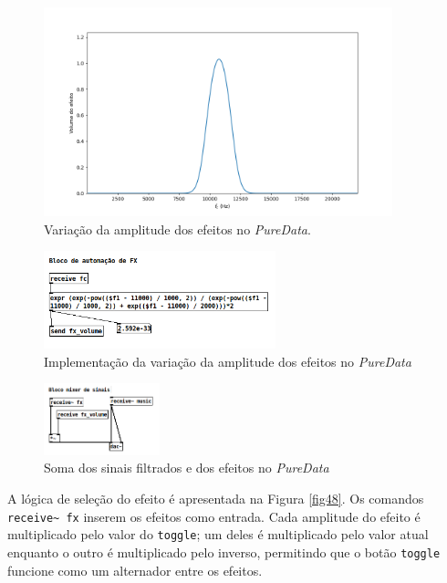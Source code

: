 \begin{figure}[h]
    \centering
    \includegraphics[width=0.9\textwidth]{figuras/fig49.png}
    \caption{Variação da amplitude dos efeitos no \textit{PureData}.}
    \label{fig49}
\end{figure}

\begin{figure}[h]
    \centering
    \includegraphics[width=0.6\textwidth]{figuras/fig50.png}
    \caption{Implementação da variação da amplitude dos efeitos no \textit{PureData}}
    \label{fig50}
\end{figure}



\begin{figure}[h]
    \centering
    \includegraphics[width=0.3\textwidth]{figuras/fig51.png}
    \caption{Soma dos sinais filtrados e dos efeitos no \textit{PureData}}
    \label{fig51}
\end{figure}

A lógica de seleção do efeito é apresentada na Figura \ref{fig48}. Os comandos \texttt{receive\textasciitilde\ fx} inserem os efeitos como entrada. Cada amplitude do efeito é multiplicado pelo valor do \texttt{toggle}; um deles é multiplicado pelo valor atual enquanto o outro é multiplicado pelo inverso, permitindo que o botão \texttt{toggle} funcione como um alternador entre os efeitos.

